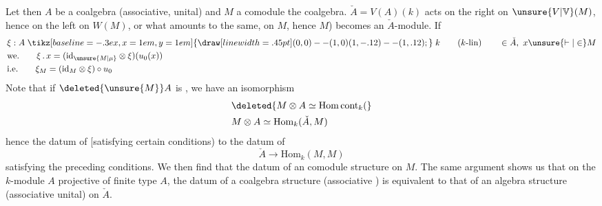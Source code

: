 Let then $A$ be a coalgebra (associative, unital) and $M$ a comodule  the coalgebra. $\check A=V(A)(k)$ acts on the right on $\unsure{V|\mathbb V}(M)$, hence on the left on $W(M)$, or what amounts to the same, on $M$, hence $M$) becomes an $\check A$-module. If
\[
\begin{aligned}
 &\xi:A\mathrel{\tikz[baseline=-.3ex,x=1em,y=1em]{\draw[line width=.45pt] (0,0)--(1,0) (1,-.12)--(1,.12);}}k\qquad(k\text{-}\mathrm{lin})\qquad\in\check A,\ x\unsure{\vdash|\in}M\\
 &\text{we.}\qquad \xi\,.\,x=(\mathrm{id}_{\unsure{M|\mu}}\otimes\xi)(u_0(x))\\
 &\text{i.e.}\qquad \xi_M=(\mathrm{id}_M\otimes\xi)\circ u_0
\end{aligned}
\]
Note that if $\deleted{\unsure{M}}A$ is , we have an isomorphism
\[
\begin{aligned}
 &\deleted{M\otimes A\simeq\mathrm{Hom}\,\mathrm{cont}_k(}\\
 &M\otimes A\simeq\mathrm{Hom}_k(\check A,M)
\end{aligned}
\]
hence the datum of
[satisfying certain conditions)  to the datum of
\[
 \check A\longrightarrow\mathrm{Hom}_k(M,M)
\]
satisfying the preceding conditions. We then find that the datum of an comodule structure  on $M$. The same argument shows us that on the $k$-module $A$ projective of finite type $A$, the datum of a coalgebra structure (associative ) is equivalent to that of an algebra structure (associative unital) on $\check A$.

